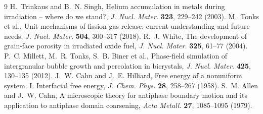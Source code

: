\documentclass[11pt,a4paper]{article}
\begin{document}
\small
\begin{thebibliography}{9}
\setlength{\itemsep}{1pt}
H.~Trinkaus and B.~N. Singh, Helium accumulation in metals during
irradiation -- where do we stand?, \emph{J. Nucl. Mater.} \textbf{323}, 229--242 (2003).
M.~Tonks et al., Unit mechanisms of fission gas release: current understanding
and future needs, \emph{J. Nucl. Mater.} \textbf{504}, 300--317 (2018).
R.~J. White, The development of grain-face porosity in irradiated oxide fuel,
\emph{J. Nucl. Mater.} \textbf{325}, 61--77 (2004).
P.~C. Millett, M.~R. Tonks, S.~B. Biner et al., Phase-field simulation of
intergranular bubble growth and percolation in bicrystals,
\emph{J. Nucl. Mater.} \textbf{425}, 130--135 (2012).
J.~W. Cahn and J.~E. Hilliard, Free energy of a nonuniform system. I.
Interfacial free energy, \emph{J. Chem. Phys.} \textbf{28}, 258--267 (1958).
S.~M. Allen and J.~W. Cahn, A microscopic theory for antiphase boundary motion
and its application to antiphase domain coarsening, \emph{Acta Metall.}
\textbf{27}, 1085--1095 (1979).
\end{thebibliography}
\end{document}
